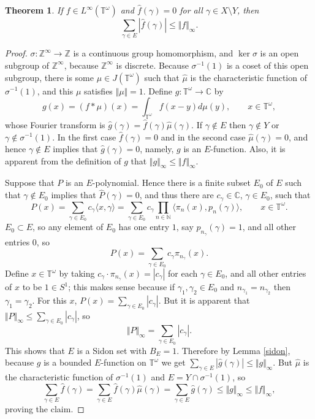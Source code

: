 \documentclass{article}
\newcommand{\inner}[2]{\langle #1, #2 \rangle}
\newcommand{\norm}[1]{\Vert #1 \Vert}
\newtheorem{theorem}{Theorem}
\begin{document}
\begin{theorem}
If $f \in L^\infty(\mathbb{T}^\omega)$ and $\hat{f}(\gamma)=0$ for all $\gamma \in X \setminus Y$, then 
\[
\sum_{\gamma \in E} |\hat{f}(\gamma)| \leq \norm{f}_\infty.
\]
\label{infinitySidon}
\end{theorem}
\begin{proof}
$\sigma:\mathbb{Z}^\infty \to \mathbb{Z}$ is a continuous group homomorphism, and $\ker \sigma$ is an open subgroup of
$\mathbb{Z}^\infty$, because $\mathbb{Z}^\infty$ is discrete. Because $\sigma^{-1}(1)$ is a coset of this open subgroup,
there is some $\mu \in J(\mathbb{T}^\omega)$ such that $\hat{\mu}$ is the characteristic function of $\sigma^{-1}(1)$, and this $\mu$ satisfies
$\norm{\mu}=1$. Define $g:\mathbb{T}^\omega \to \mathbb{C}$ by 
\[
g(x)=(f*\mu)(x) = \int_{\mathbb{T}^\omega} f(x-y) d\mu(y), \qquad x \in \mathbb{T}^\omega,
\]
whose Fourier transform is $\hat{g}(\gamma)=\hat{f}(\gamma) \hat{\mu}(\gamma)$. 
If $\gamma \not \in E$ then $\gamma \not \in Y$ or $\gamma \not \in \sigma^{-1}(1)$. In the first case
$\hat{f}(\gamma)=0$ and in the second case $\hat{\mu}(\gamma) =0$, and hence $\gamma \not \in E$ implies that
$\hat{g}(\gamma)=0$, namely, $g$ is an $E$-function. Also, it is apparent from the definition of $g$ that $\norm{g}_\infty 
\leq \norm{f}_\infty$. 

Suppose that $P$ is an $E$-polynomial. Hence there is a finite subset $E_0$ of $E$ such that
$\gamma \not \in E_0$ implies that $\hat{P}(\gamma)=0$, and thus there are $c_\gamma \in \mathbb{C}$, $\gamma \in E_0$, such that 
\[
P(x) = \sum_{\gamma \in E_0} c_\gamma \inner{x}{\gamma}
=\sum_{\gamma \in E_0} c_\gamma \prod_{n \in \mathbb{N}} \inner{\pi_n(x)}{p_n(\gamma)}, \qquad
x \in \mathbb{T}^\omega.
\]
$E_0 \subset E$, so any element of $E_0$ has one entry $1$, say $p_{n_\gamma}(\gamma)=1$, and all other entries $0$, so
\[
P(x) = \sum_{\gamma \in E_0} c_\gamma \pi_{n_\gamma}(x).
\]
Define $x \in \mathbb{T}^\omega$ by taking $c_\gamma \cdot  \pi_{n_\gamma}(x)=|c_\gamma|$ for each $\gamma \in E_0$, and all
other entries of $x$ to be $1 \in S^1$; this makes sense because if $\gamma_1,\gamma_2 \in E_0$ and $n_{\gamma_1}= n_{\gamma_2}$ then
$\gamma_1=\gamma_2$. For this $x$, $P(x)=\sum_{\gamma \in E_0} |c_\gamma|$. But  it is apparent that
$\norm{P}_\infty \leq \sum_{\gamma \in E_0} |c_\gamma|$, so
\[
\norm{P}_\infty = \sum_{\gamma \in E_0} |c_\gamma|.
\]
This shows that $E$ is a Sidon set with $B_E=1$. Therefore by Lemma \ref{sidon}, because $g$ is a bounded $E$-function on $\mathbb{T}^\omega$ we
get
$\sum_{\gamma \in E} |\hat{g}(\gamma)| \leq \norm{g}_\infty$.
But $\hat{\mu}$ is the characteristic function of $\sigma^{-1}(1)$ and $E=Y \cap \sigma^{-1}(1)$, so
\[
\sum_{\gamma \in E} \hat{f}(\gamma) 
= \sum_{\gamma \in E} \hat{f}(\gamma) \hat{\mu}(\gamma)
= \sum_{\gamma \in E} \hat{g}(\gamma) \leq \norm{g}_\infty \leq \norm{f}_\infty,
\]
proving the claim.
\end{proof}
\end{document}
